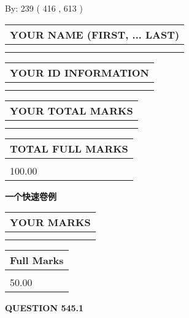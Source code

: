 \documentclass{ctexart}
\begin{document}
   
\hspace{1.0in} By: 
 239 ( 416 ,  613 )
   
   
   
   
\newpage 
\setcounter{page}{ 
   545001 } 
   
   
   
   
\noindent\begin{tabular}{|l|}
\hline
YOUR NAME (FIRST, ... LAST)  \\
\hline
 \\ 
 \\ 
\hline
\end{tabular}
\hspace{0.05in} \begin{tabular}{|l|}
\hline
 YOUR   ID   INFORMATION  \\
\hline
 \\ 
 \\ 
\hline
\end{tabular}
   
   
\vspace{0.2in}\noindent\begin{tabular}{|l|}
\hline
YOUR TOTAL MARKS  \\
\hline
 \\ 
 \\ 
\hline
\end{tabular}
\hspace{0.05in} \begin{tabular}{|l|}
\hline
TOTAL FULL MARKS  \\
\hline
 \\ 
100.00 \\
\hline
\end{tabular}
   
   
 \vspace{0.2in}
{\LARGE {\textbf{ 一个快速卷例}}}
   
   
  
\vspace{0.2in}
  
\noindent\begin{tabular}{|l|}
\hline
 YOUR MARKS  \\
\hline
 \\ 
 \\ 
\hline
\end{tabular}
\hspace{0.05in} \begin{tabular}{|l|}
\hline
 Full Marks  \\
\hline
 \\ 
50.00 \\
\hline
\end{tabular}
{\textbf{\Large{QUESTION
545.1 
}}}
  
\end{document}
